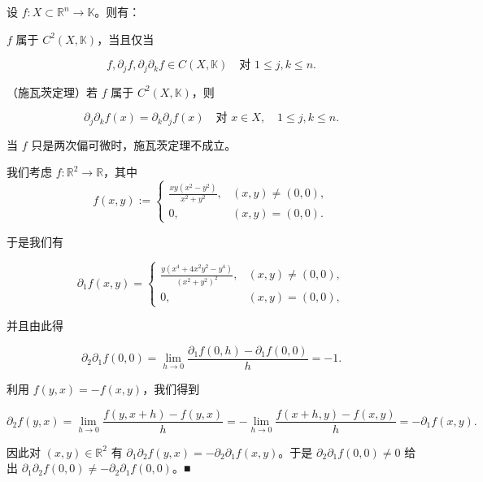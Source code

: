 
\begin{corollary}

设 $ f : X \subset \mathbb{R}^{n} \to \mathbb{K} $。则有：

\begin{subitems}
\item

$ f $ 属于 $ C^{2}(X, \mathbb{K}) $，当且仅当

\[
f, \partial_{j}f, \partial_{j}\partial_{k}f \in C(X, \mathbb{K}) \quad \text{对 } 1 \le j, k \le n .
\]
\item

（施瓦茨定理）若 $ f $ 属于 $ C^{2}(X, \mathbb{K}) $，则

\[
\partial_{j}\partial_{k}f(x) = \partial_{k}\partial_{j}f(x) \quad \text{对 } x \in X , \quad 1 \le j, k \le n .
\]
\end{subitems}

\end{corollary}

\begin{remark}

当 $ f $ 只是两次偏可微时，施瓦茨定理不成立。

\proofhead
我们考虑 $ f : \mathbb{R}^{2} \to \mathbb{R} $，其中
\begin{equation*}
f(x, y) := \begin{cases} \frac{xy(x^{2} - y^{2})}{x^{2} + y^{2}} , & (x, y) \ne (0, 0) , \\ 0 , & (x, y) = (0, 0) . \end{cases}
\end{equation*}

于是我们有

\begin{equation*}
\partial_{1}f(x, y) = \begin{cases} \frac{y(x^{4} + 4x^{2}y^{2} - y^{4})}{(x^{2} + y^{2})^{2}} , & (x, y) \ne (0, 0) , \\ 0 , & (x, y) = (0, 0) , \end{cases}
\end{equation*}

并且由此得

\[
\partial_{2}\partial_{1}f(0, 0) = \lim_{h \to 0}\frac{\partial_{1}f(0, h) - \partial_{1}f(0, 0)}{h} = -1 .
\]

利用 $ f(y, x) = -f(x, y) $，我们得到

\[
\partial_{2}f(y, x) = \lim_{h \to 0}\frac{f(y, x + h) - f(y, x)}{h} = -\lim_{h \to 0}\frac{f(x + h, y) - f(x, y)}{h} = -\partial_{1}f(x, y) .
\]

因此对 $ (x, y) \in \mathbb{R}^{2} $ 有 $ \partial_{1}\partial_{2}f(y, x) = -\partial_{2}\partial_{1}f(x, y) $。于是 $ \partial_{2}\partial_{1}f(0, 0) \ne 0 $ 给出 $ \partial_{1}\partial_{2}f(0, 0) \ne -\partial_{2}\partial_{1}f(0, 0) $。\nobreak\hspace{0.35em}■

\end{remark}

